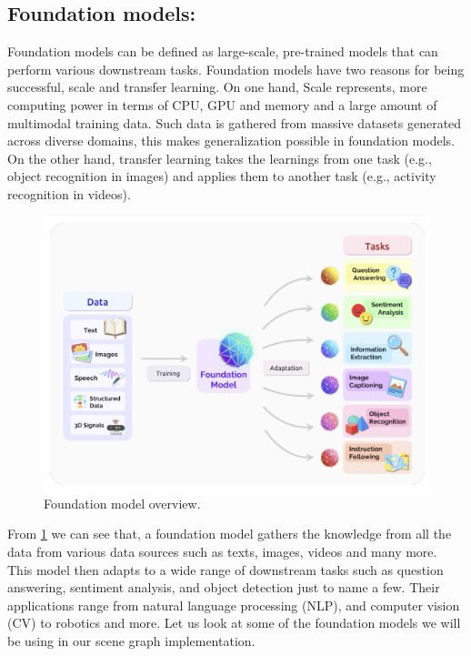 \subsection{Foundation models:}
Foundation models can be defined as large-scale, pre-trained models that can perform various downstream tasks\cite{bommasani2022opportunitiesrisksfoundationmodels}. 
Foundation models have two reasons for being successful, scale and transfer learning. On one hand, Scale represents,
more computing power in terms of CPU, GPU and memory and a large amount of multimodal training data. Such data is gathered from 
massive datasets generated across diverse domains, this makes generalization possible in foundation models. On the other hand, transfer
learning takes the learnings from one task (e.g., object recognition in images) and
applies them to another task (e.g., activity recognition in videos). 
\begin{figure}[ht!]
    \centering
    \includegraphics[width=\textwidth]{images/FoundationModels.png}
    \caption{Foundation model overview.}
    \label{fig:foundation_model}
\end{figure}
From \cref{fig:foundation_model} we can see that, 
a foundation model gathers the knowledge from all the data from various data sources such as texts, images, videos and many more.
This model then adapts to a wide range of downstream tasks such as question answering, sentiment analysis, and object detection just to 
name a few. Their applications range from natural language processing (NLP), and computer vision (CV) to robotics and more. 
Let us look at some of the foundation models we will be using in our scene graph implementation.

